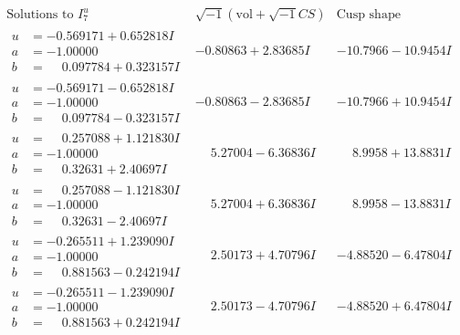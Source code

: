 \documentclass[1p]{elsarticle_modified}
\theoremstyle{definition}
\newcommand{\I}{\sqrt{-1}}
\begin{document}
$$\begin{array}{c|c|c}  
\text{Solutions to }I^u_{7}& \I (\text{vol} + \sqrt{-1}CS) & \text{Cusp shape}\\
 \hline 
\begin{aligned}
u &= -0.569171 + 0.652818 I \\
a &= -1.00000\phantom{ +0.000000I} \\
b &= \phantom{-}0.097784 + 0.323157 I\end{aligned}
 & -0.80863 + 2.83685 I & -10.7966 - 10.9454 I \\ \hline\begin{aligned}
u &= -0.569171 - 0.652818 I \\
a &= -1.00000\phantom{ +0.000000I} \\
b &= \phantom{-}0.097784 - 0.323157 I\end{aligned}
 & -0.80863 - 2.83685 I & -10.7966 + 10.9454 I \\ \hline\begin{aligned}
u &= \phantom{-}0.257088 + 1.121830 I \\
a &= -1.00000\phantom{ +0.000000I} \\
b &= \phantom{-}0.32631 + 2.40697 I\end{aligned}
 & \phantom{-}5.27004 - 6.36836 I & \phantom{-}8.9958 + 13.8831 I \\ \hline\begin{aligned}
u &= \phantom{-}0.257088 - 1.121830 I \\
a &= -1.00000\phantom{ +0.000000I} \\
b &= \phantom{-}0.32631 - 2.40697 I\end{aligned}
 & \phantom{-}5.27004 + 6.36836 I & \phantom{-}8.9958 - 13.8831 I \\ \hline\begin{aligned}
u &= -0.265511 + 1.239090 I \\
a &= -1.00000\phantom{ +0.000000I} \\
b &= \phantom{-}0.881563 - 0.242194 I\end{aligned}
 & \phantom{-}2.50173 + 4.70796 I & -4.88520 - 6.47804 I \\ \hline\begin{aligned}
u &= -0.265511 - 1.239090 I \\
a &= -1.00000\phantom{ +0.000000I} \\
b &= \phantom{-}0.881563 + 0.242194 I\end{aligned}
 & \phantom{-}2.50173 - 4.70796 I & -4.88520 + 6.47804 I \\ \hline\begin{aligned}

\end{aligned}
\end{array}$$
\end{document}
